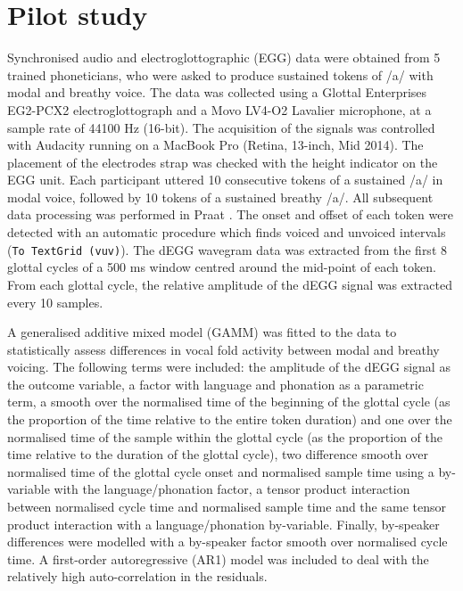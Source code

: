 \documentclass[
  12pt,
  a4paper,
]{article}
\begin{document}
\hypertarget{pilot-study}{%
\section{Pilot study}\label{pilot-study}}

\label{s:pilot}

Synchronised audio and electroglottographic (EGG) data were obtained
from 5 trained phoneticians, who were asked to produce sustained tokens
of /a/ with modal and breathy voice. The data was collected using a
Glottal Enterprises EG2-PCX2 electroglottograph and a Movo LV4-O2
Lavalier microphone, at a sample rate of 44100 Hz (16-bit). The
acquisition of the signals was controlled with Audacity running on a
MacBook Pro (Retina, 13-inch, Mid 2014). The placement of the electrodes
strap was checked with the height indicator on the EGG unit. Each
participant uttered 10 consecutive tokens of a sustained /a/ in modal
voice, followed by 10 tokens of a sustained breathy /a/. All subsequent
data processing was performed in Praat \citep{boersma2018}. The onset
and offset of each token were detected with an automatic procedure which
finds voiced and unvoiced intervals (\texttt{To\ TextGrid\ (vuv)}). The
dEGG wavegram data was extracted from the first 8 glottal cycles of a
500 ms window centred around the mid-point of each token. From each
glottal cycle, the relative amplitude of the dEGG signal was extracted
every 10 samples.

A generalised additive mixed model (GAMM) was fitted to the data to
statistically assess differences in vocal fold activity between modal
and breathy voicing. The following terms were included: the amplitude of
the dEGG signal as the outcome variable, a factor with language and
phonation as a parametric term, a smooth over the normalised time of the
beginning of the glottal cycle (as the proportion of the time relative
to the entire token duration) and one over the normalised time of the
sample within the glottal cycle (as the proportion of the time relative
to the duration of the glottal cycle), two difference smooth over
normalised time of the glottal cycle onset and normalised sample time
using a by-variable with the language/phonation factor, a tensor product
interaction between normalised cycle time and normalised sample time and
the same tensor product interaction with a language/phonation
by-variable. Finally, by-speaker differences were modelled with a
by-speaker factor smooth over normalised cycle time. A first-order
autoregressive (AR1) model was included to deal with the relatively high
auto-correlation in the residuals.
\end{document}
